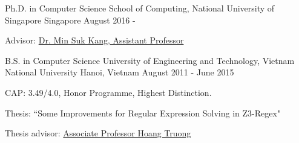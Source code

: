 


\begin{cventries}

  \cventry
    {Ph.D. in Computer Science} %
    {School of Computing, National University of Singapore} %
    {Singapore} %
    {August 2016 - } %
    {
      \begin{cvitems} %
        \item {Advisor: \href{http://www.comp.nus.edu.sg/~kangms/}{Dr. Min Suk Kang, Assistant Professor}}
      \end{cvitems}
    }

  \cventry
    {B.S. in Computer Science} %
    {University of Engineering and Technology, Vietnam National University} %
    {Hanoi, Vietnam} %
    {August 2011 - June 2015} %
    {
      \begin{cvitems} %
        \item {CAP: 3.49/4.0, Honor Programme, Highest Distinction.}
        \item {Thesis: “Some Improvements for Regular Expression Solving in Z3-Regex"}
        \item {Thesis advisor: \href{http://www.uet.vnu.edu.vn/~hoangta/}{Associate Professor Hoang Truong}}
      \end{cvitems}
    }


\end{cventries}
